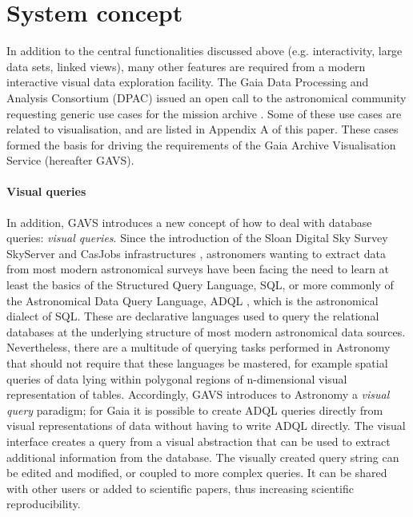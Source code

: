 \documentclass[longauth, final]{aa}
\begin{document}
\section{System concept}
\label{sec:sysconc}

In addition to the central functionalities discussed above (e.g. interactivity, large data sets, linked views), many other features are required from a modern interactive visual data exploration facility. The Gaia Data Processing and Analysis Consortium (DPAC) issued an open call to the astronomical community  requesting generic use cases for the mission archive \citep{BrownTN026}. Some of these use cases are related to visualisation, and are listed in Appendix A of this paper. These cases formed the basis for driving the requirements of the Gaia Archive Visualisation Service (hereafter GAVS). 

\paragraph{Visual queries}
In addition, GAVS introduces a new concept of how to deal with database queries: {\it visual queries}. Since the introduction of the Sloan Digital Sky Survey SkyServer and CasJobs infrastructures \citep[e.g.][]{2000AJ....120.1579Y, 2016AJ....151...44D}, astronomers wanting to extract data from most modern astronomical surveys  have been facing the need to learn at least the basics of the Structured Query Language, SQL, or more commonly of the Astronomical Data Query Language, ADQL \citep{2008IVOAADQL}, which is the astronomical dialect of SQL.
These are declarative languages used to query the relational databases at the underlying structure of most modern astronomical data sources. Nevertheless, there are a multitude of querying tasks performed in Astronomy that should not require that these languages be mastered, for example  spatial queries of data lying within polygonal regions of n-dimensional visual representation of tables. Accordingly, GAVS introduces to Astronomy a {\it visual query} paradigm; for Gaia it is possible to create ADQL queries directly from visual representations of data without having to write ADQL directly. 
The visual interface creates a query from a visual abstraction that can be used to extract additional information from the database. The visually created query string can be edited and modified, or coupled to more complex queries. It can be shared with other users or added to scientific papers, thus increasing scientific reproducibility.
\end{document}
